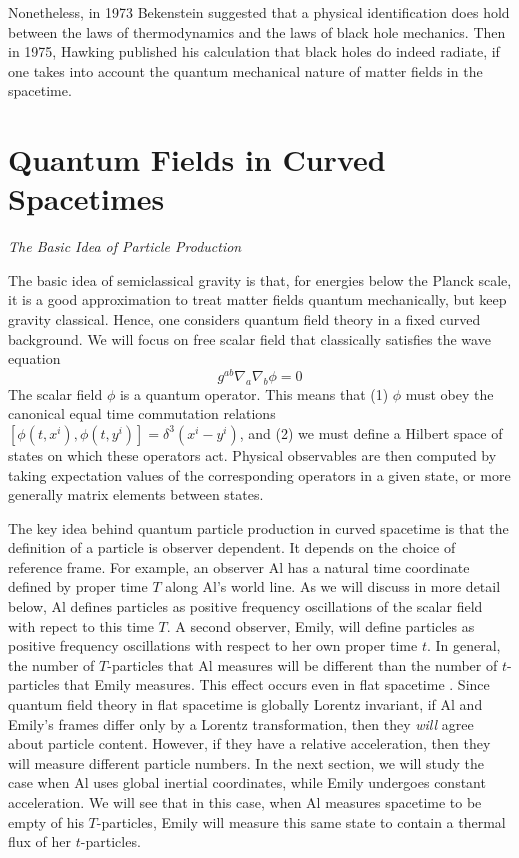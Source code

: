 \documentclass[12pt]{article}
\newcommand{\be}{\begin{equation}}
\newcommand{\ee}{\end{equation}}
\newcommand{\sectiono}[1]{\section{#1}\setcounter{equation}{0}}
\begin{document}
Nonetheless, in 1973 Bekenstein \cite{beck} suggested that a physical
identification does hold
between the  laws of thermodynamics and the laws of black hole mechanics.
Then in 1975,
Hawking published his calculation that black holes do indeed radiate, if
one takes into
account the quantum mechanical nature of matter fields in the spacetime.


\sectiono{Quantum Fields in Curved Spacetimes}
\label{qftcs}

\vskip 0.1in\noindent
{\it The Basic Idea of Particle Production}
\vskip 0.05in

The basic idea of semiclassical gravity is that, for energies below the
Planck scale,
it is a good approximation to treat matter fields quantum mechanically, but keep
gravity classical.  Hence, one considers quantum field theory in a fixed
curved background.
We will focus on free scalar field that classically satisfies the wave equation
%
\be\label{wave}g^{ab}\nabla _a \nabla _b \phi =0\ee
%
The scalar field $\phi$ is a quantum operator. This means that
(1) $\phi$ must obey the canonical equal time commutation relations
$[\phi (t, x^i ), \phi (t, y^i )] =\delta ^3 (x^i -y^i )$,
and (2) we must define a Hilbert space of states on which these operators act.
Physical observables are then computed by taking expectation values of the
corresponding operators in a given
state, or more generally matrix elements between states.

The key idea behind quantum particle production in curved spacetime is
that the definition of a particle is observer dependent.  It depends
on the choice of reference frame.  For example, an observer Al has a natural
time coordinate defined by proper time $T$ along Al's world line.
As we will discuss in more detail below, Al defines
particles as positive frequency oscillations of the scalar field with
repect to this time
$T$.  A second observer, Emily, will define particles as positive frequency
oscillations with
respect to her own proper time $t$. In general, the number of $T$-particles
that Al measures
will be different than the number of $t$-particles that Emily measures.
This effect occurs even in flat spacetime \cite{fulling,unruh}.
Since quantum field theory in flat spacetime is globally Lorentz invariant,
if Al
and Emily's frames differ only by a Lorentz transformation, then they
{\it will} agree about particle content.  However, if they have a
relative acceleration, then they will measure different particle numbers.
In the next section, we will study the case when Al uses
global inertial coordinates, while Emily undergoes constant acceleration.
We will see that in this case, when Al measures spacetime to be empty of
his $T$-particles,
Emily will measure this same state to contain a thermal flux of her
$t$-particles.
\end{document}
